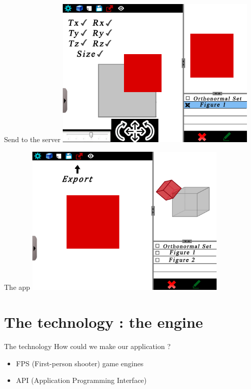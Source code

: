 \documentclass[a4paper,10pt]{beamer}
\begin{document}
			\begin{frame}{Send to the server}
				\includegraphics[height=205pt]{maquette/maquette_7.png}
			\end{frame}
			
			\begin{frame}{The app}
				\includegraphics[height=205pt]{maquette/maquette_8.png}
			\end{frame}
			
		
		
	\section{The technology : the engine}
			
			\begin{frame}{The technology}
				How could we make our application ?
				\begin{itemize}
					\item FPS (First-person shooter) game engines
					\item API (Application Programming Interface)

				\end{itemize}
			\end{frame}
			
\end{document}
